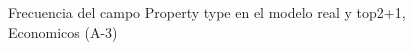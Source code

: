 \begin{figure}[H]
    \centering
    
    \caption{Frecuencia del campo Property type en el modelo real y top2+1, Economicos (A-3)}
    \label{frecuency-Property Type-top2+1}
\end{figure}